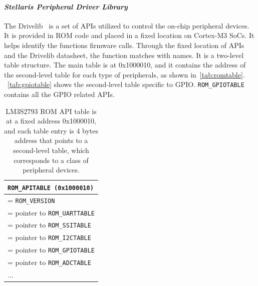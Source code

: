 \paragraph{\textbf{\textit{Stellaris Peripheral Driver Library}}} The Drivelib~\cite{lm3s2793rom} is a set of APIs utilized to control the on-chip peripheral devices. It is provided in ROM code and placed in a fixed location on Cortex-M3 SoCs. It helps identify the functions firmware calls. Through the fixed location of APIs and the Drivelib datasheet, the function matches with names. It is a two-level table structure. The main table is at 0x1000010, and it contains the address of the second-level table for each type of peripherals, as shown in~\autoref{tab:romtable}. ~\autoref{tab:gpiotable} shows the second-level table specific to GPIO.  \texttt{ROM\_GPIOTABLE} contains all the GPIO related APIs. %
%
\begin{center}
	\begin{table}
		\small
		\begin{tabular}{|p{7.2cm}|} 
			\hline
			\texttt{ROM\_APITABLE (0x1000010)} \\ %
			\hline
			[0] = \texttt{ROM\_VERSION} \\
			\hline
			[1] = pointer to \texttt{ROM\_UARTTABLE} \\
			\hline
			[2] = pointer to \texttt{ROM\_SSITABLE} \\
			\hline
			[3] = pointer to \texttt{ROM\_I2CTABLE} \\
			\hline
			[4] = pointer to \texttt{ROM\_GPIOTABLE} \\
			\hline
			[5] = pointer to \texttt{ROM\_ADCTABLE} \\
			\hline
			... \\ 
			\hline
		\end{tabular}
		\caption{LM3S2793 ROM API table is at a fixed address 0x1000010, and each table entry is 4 bytes address that points to a second-level table, which corresponds to a class of peripheral devices.}
		\label{tab:romtable}
	\end{table}
\end{center}
%
